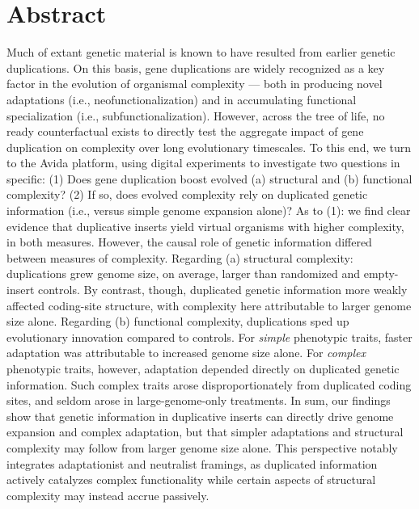 \section*{Abstract}
Much of extant genetic material is known to have resulted from earlier genetic duplications.
On this basis, gene duplications are widely recognized as a key factor in the evolution of organismal complexity --- both in producing novel adaptations (i.e., neofunctionalization) and in accumulating functional specialization (i.e., subfunctionalization).
However, across the tree of life, no ready counterfactual exists to directly test the aggregate impact of gene duplication on complexity over long evolutionary timescales.
To this end, we turn to the Avida platform, using digital experiments to investigate two questions in specific:
(1) Does gene duplication boost evolved (a) structural and (b) functional complexity?
(2) If so, does evolved complexity rely on duplicated genetic information (i.e., versus simple genome expansion alone)?
As to (1): we find clear evidence that duplicative inserts yield virtual organisms with higher complexity, in both measures.
However, the causal role of genetic information differed between measures of complexity.
Regarding (a) structural complexity: duplications grew genome size, on average, larger than randomized and empty-insert controls.
By contrast, though, duplicated genetic information more weakly affected coding-site structure, with complexity here attributable to larger genome size alone.
Regarding (b) functional complexity, duplications sped up evolutionary innovation compared to controls.
For \textit{simple} phenotypic traits, faster adaptation was attributable to increased genome size alone.
For \textit{complex} phenotypic traits, however, adaptation depended directly on duplicated genetic information.
Such complex traits arose disproportionately from duplicated coding sites, and seldom arose in large-genome-only treatments.
In sum, our findings show that genetic information in duplicative inserts can directly drive genome expansion and complex adaptation, but that simpler adaptations and structural complexity may follow from larger genome size alone.
This perspective notably integrates adaptationist and neutralist framings, as duplicated information actively catalyzes complex functionality while certain aspects of structural complexity may instead accrue passively.
